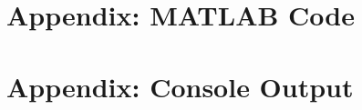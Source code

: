 \documentclass[12pt]{article}
\begin{document}
	\section{Appendix: MATLAB Code}

	
    \newpage
	\vspace{1em}

	

	\vspace{1em}

	

	\newpage
	\section{Appendix: Console Output}

	
\end{document}
